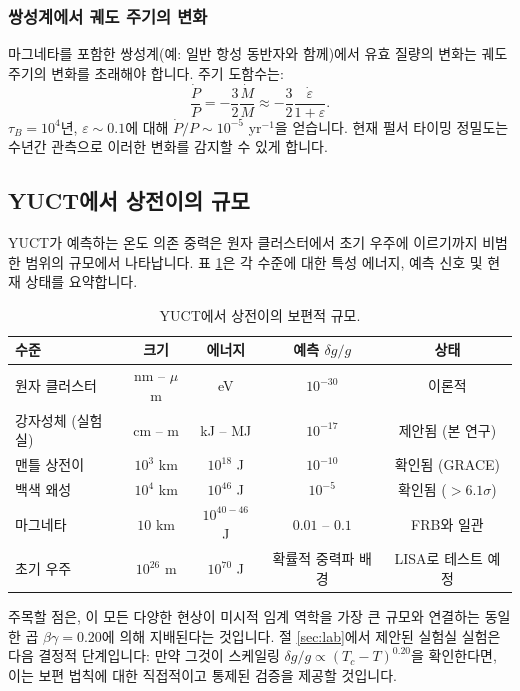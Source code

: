 \documentclass[11pt,a4paper]{article}
\newcommand{\eps}{\varepsilon}
\begin{document}
	\subsubsection{쌍성계에서 궤도 주기의 변화}
	\label{subsubsec:magnetars-binary}
	
	마그네타를 포함한 쌍성계(예: 일반 항성 동반자와 함께)에서 유효 질량의 변화는 궤도 주기의 변화를 초래해야 합니다. 주기 도함수는:
	\begin{equation}
		\frac{\dot{P}}{P} = -\frac{3}{2} \frac{\dot{M}}{M} \approx -\frac{3}{2} \frac{\dot{\eps}}{1+\eps}.
		\label{eq:pdot}
	\end{equation}
	$\tau_B = 10^4$년, $\eps \sim 0.1$에 대해 $\dot{P}/P \sim 10^{-5}$ yr$^{-1}$을 얻습니다. 현재 펄서 타이밍 정밀도는 수년간 관측으로 이러한 변화를 감지할 수 있게 합니다.
	
	\subsection{YUCT에서 상전이의 규모}
	\label{subsec:scale}
	
	YUCT가 예측하는 온도 의존 중력은 원자 클러스터에서 초기 우주에 이르기까지 비범한 범위의 규모에서 나타납니다. 표 \ref{tab:scale}은 각 수준에 대한 특성 에너지, 예측 신호 및 현재 상태를 요약합니다.
	
	\begin{table}[htbp]
		\centering
		\caption{YUCT에서 상전이의 보편적 규모.}
		\label{tab:scale}
		\small
		\begin{tabular}{lcccc}
			\toprule
			\textbf{수준} & \textbf{크기} & \textbf{에너지} & \textbf{예측 } \(\delta g/g\) & \textbf{상태} \\
			\midrule
			원자 클러스터 & nm – $\mu$m & eV & $10^{-30}$ & 이론적 \\
			강자성체 (실험실) & cm – m & kJ – MJ & $10^{-17}$ & 제안됨 (본 연구) \\
			맨틀 상전이 & $10^3$ km & $10^{18}$ J & $10^{-10}$ & 확인됨 (GRACE) \\
			백색 왜성 & $10^4$ km & $10^{46}$ J & $10^{-5}$ & 확인됨 ($>6.1\sigma$) \\
			마그네타 & $10$ km & $10^{40-46}$ J & $0.01$ – $0.1$ & FRB와 일관 \\
			초기 우주 & $10^{26}$ m & $10^{70}$ J & 확률적 중력파 배경 & LISA로 테스트 예정 \\
			\bottomrule
		\end{tabular}
	\end{table}
	
	주목할 점은, 이 모든 다양한 현상이 미시적 임계 역학을 가장 큰 규모와 연결하는 동일한 곱 $\beta\gamma = 0.20$에 의해 지배된다는 것입니다. 절 \ref{sec:lab}에서 제안된 실험실 실험은 다음 결정적 단계입니다: 만약 그것이 스케일링 $\delta g/g \propto (T_c - T)^{0.20}$을 확인한다면, 이는 보편 법칙에 대한 직접적이고 통제된 검증을 제공할 것입니다.
	
\end{document}
